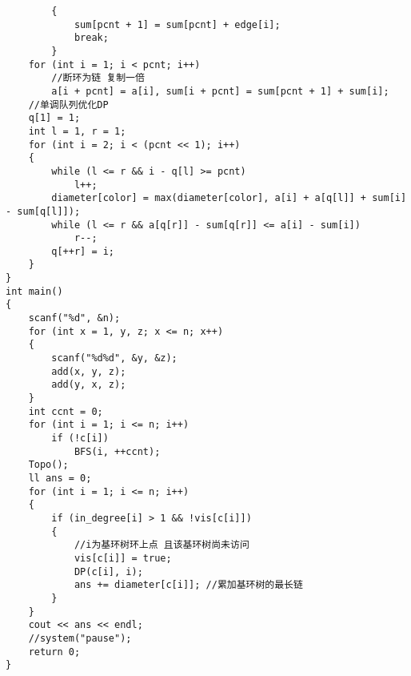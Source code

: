 \begin{lstlisting}
        {
            sum[pcnt + 1] = sum[pcnt] + edge[i];
            break;
        }
    for (int i = 1; i < pcnt; i++)
        //断环为链 复制一倍
        a[i + pcnt] = a[i], sum[i + pcnt] = sum[pcnt + 1] + sum[i];
    //单调队列优化DP
    q[1] = 1;
    int l = 1, r = 1;
    for (int i = 2; i < (pcnt << 1); i++)
    {
        while (l <= r && i - q[l] >= pcnt)
            l++;
        diameter[color] = max(diameter[color], a[i] + a[q[l]] + sum[i] - sum[q[l]]);
        while (l <= r && a[q[r]] - sum[q[r]] <= a[i] - sum[i])
            r--;
        q[++r] = i;
    }
}
int main()
{
    scanf("%d", &n);
    for (int x = 1, y, z; x <= n; x++)
    {
        scanf("%d%d", &y, &z);
        add(x, y, z);
        add(y, x, z);
    }
    int ccnt = 0;
    for (int i = 1; i <= n; i++)
        if (!c[i])
            BFS(i, ++ccnt);
    Topo();
    ll ans = 0;
    for (int i = 1; i <= n; i++)
    {
        if (in_degree[i] > 1 && !vis[c[i]])
        {
            //i为基环树环上点 且该基环树尚未访问
            vis[c[i]] = true;
            DP(c[i], i);
            ans += diameter[c[i]]; //累加基环树的最长链
        }
    }
    cout << ans << endl;
    //system("pause");
    return 0;
}
\end{lstlisting}